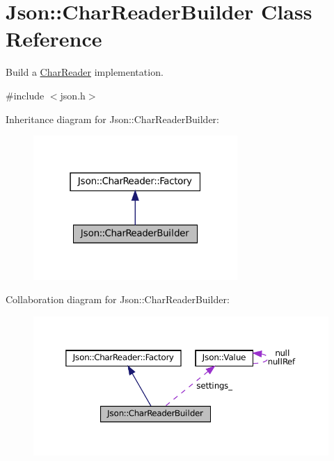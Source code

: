 \hypertarget{classJson_1_1CharReaderBuilder}{}\section{Json\+:\+:Char\+Reader\+Builder Class Reference}
\label{classJson_1_1CharReaderBuilder}


Build a \hyperlink{classJson_1_1CharReader}{Char\+Reader} implementation.  




{\ttfamily \#include $<$json.\+h$>$}



Inheritance diagram for Json\+:\+:Char\+Reader\+Builder\+:
\nopagebreak
\begin{figure}[H]
\begin{center}
\leavevmode
\includegraphics[width=220pt]{classJson_1_1CharReaderBuilder__inherit__graph}
\end{center}
\end{figure}


Collaboration diagram for Json\+:\+:Char\+Reader\+Builder\+:
\nopagebreak
\begin{figure}[H]
\begin{center}
\leavevmode
\includegraphics[width=350pt]{classJson_1_1CharReaderBuilder__coll__graph}
\end{center}
\end{figure}
